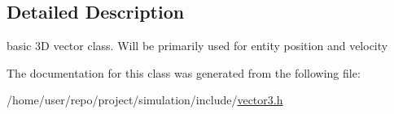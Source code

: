 \subsection{Detailed Description}
basic 3D vector class. Will be primarily used for entity position and velocity 

The documentation for this class was generated from the following file\+:\begin{DoxyCompactItemize}
\item 
/home/user/repo/project/simulation/include/\hyperlink{vector3_8h}{vector3.\+h}\end{DoxyCompactItemize}
